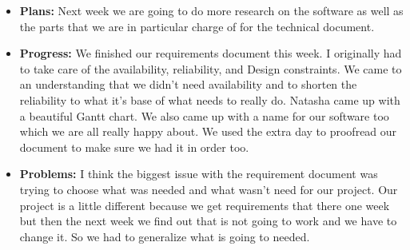 \documentclass[10pt,draftclsnofoot,onecolumn]{IEEEtran}
\begin{document}
\begin{itemize}
	\item \textbf{Plans: }Next week we are going to do more research on the software as well as the parts that we are in particular charge of for the technical document.
	\item \textbf{Progress: }We finished our requirements document this week. I originally had to take care of the availability, reliability, and Design constraints. We came to an understanding that we didn’t need availability and to shorten the reliability to what it’s base of what needs to really do. Natasha came up with a beautiful Gantt chart. We also came up with a name for our software too which we are all really happy about. We used the extra day to proofread our document to make sure we had it in order too.
	\item \textbf{Problems: }I think the biggest issue with the requirement document was trying to choose what was needed and what wasn’t need for our project. Our project is a little different because we get requirements that there one week but then the next week we find out that is not going to work and we have to change it. So we had to generalize what is going to needed.
\end{itemize}
\end{document}
